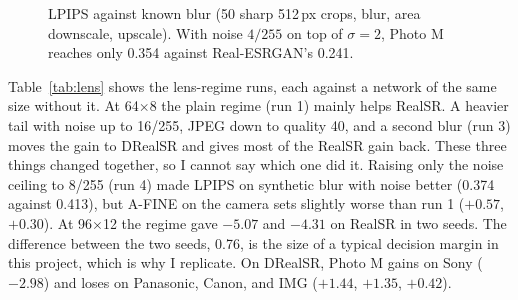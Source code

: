 \documentclass[conference]{IEEEtran}
\begin{document}
\begin{figure}[t]
\centering
{}
\caption{LPIPS against known blur (50 sharp 512\,px crops, blur, area downscale, upscale). With noise $4/255$ on top of
$\sigma=2$, Photo M reaches only 0.354 against Real-ESRGAN's 0.241.}
\label{fig:e3}
\end{figure}

Table~\ref{tab:lens} shows the lens-regime runs, each against a network of the same size without it. At 64$\times$8
the plain regime (run 1) mainly helps RealSR. A heavier tail with noise up to 16/255, JPEG down to quality 40, and a
second blur (run 3) moves the gain to DRealSR and gives most of the RealSR gain back. These three things changed
together, so I cannot say which one did it. Raising only the noise ceiling to 8/255 (run 4) made LPIPS on synthetic
blur with noise better (0.374 against 0.413), but A-FINE on the camera sets slightly worse than run 1 ($+0.57$,
$+0.30$). At 96$\times$12 the regime gave $-5.07$ and $-4.31$ on RealSR in two seeds. The difference between the two
seeds, 0.76, is the size of a typical decision margin in this project, which is why I replicate. On DRealSR, Photo M
gains on Sony ($-2.98$) and loses on Panasonic, Canon, and IMG ($+1.44$, $+1.35$, $+0.42$).
\end{document}
